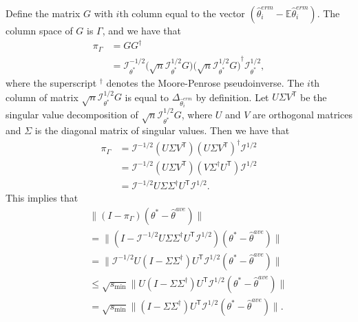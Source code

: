 \documentclass[twoside]{article}
\newcommand{\smin}{s_\text{min}}
\newcommand{\matW}{\hat W}
\newcommand{\matV}{\hat V}
\newcommand{\W}{{\hat \Theta^{\textit{owa}}}}
\newcommand{\E}{\mathbb{E}}
\newcommand{\w}{\theta}
\newcommand{\wave}{\hat\w^{ave}}
\newcommand{\wmle}{\hat\w^{erm}}
\newcommand{\wstar}{{\w^{*}}}
\newcommand{\I}{\mathcal I}
\newcommand{\trans}[1]{\ensuremath{{#1}^{\mathsf{T}}}}
\newcommand{\pinv}[1]{\ensuremath{{#1}^{\mathsf{\dagger}}}}
\newcommand{\ltwo}[1]{{\lVert {#1} \rVert}}
\newcommand{\proj}[1]{\pi_{{#1}}}
\begin{document}
Define the matrix $G$ with $i$th column equal to the vector $(\wmle_i-\E\wmle_i)$.
The column space of $G$ is $\Gamma$,
and we have that
\begin{align}
\proj\Gamma
&=
G\pinv G
\\
&= \I_\wstar^{-1/2}\bigg(\sqrt{n}\I_\wstar^{1/2}G\bigg)
             \pinv{\bigg(\sqrt{n}\I_\wstar^{1/2}G\bigg)}
   \I_\wstar^{1/2}
,
\label{eq:ggpinv}
\end{align}
where the superscript $\pinv{}$ denotes the Moore-Penrose pseudoinverse.
The $i$th column of matrix $\sqrt{n}\I^{1/2}_{\wstar}G$ is equal to $\Delta_{\wmle_i}$ by definition.
%
Let $U\Sigma \trans V$ be the singular value decomposition of $\sqrt{n}\I^{1/2}_{\wstar}G$,
where $U$ and $V$ are orthogonal matrices and $\Sigma$ is the diagonal matrix of singular values.
Then we have that
\begin{align}
\proj\Gamma
&= \I^{-1/2} (U\Sigma \trans V)\pinv{(U \Sigma \trans V)} \I^{1/2}
\\
&= \I^{-1/2} (U\Sigma \trans V)(V \pinv\Sigma \trans U) \I^{1/2}
\\
&= \I^{-1/2} U\Sigma \pinv\Sigma \trans U \I^{1/2}
.
\label{eq:vvp2}
\end{align}
This implies that
\begin{align}
~~~~~&\!\!\!\!\!\!\!\!\!\!\!\ltwo{(I-\proj\Gamma)(\wstar-\wave)}
\nonumber
\\
&=
\ltwo{(I-\I^{-1/2} U\Sigma \pinv\Sigma \trans U \I^{1/2})(\wstar - \wave)}
\\
&=
\ltwo{\I^{-1/2} U(I-\Sigma \pinv\Sigma )\trans U \I^{1/2}(\wstar - \wave)}
\\
&\le
\sqrt{\smin}\ltwo{U(I-\Sigma \pinv\Sigma )\trans U \I^{1/2}(\wstar - \wave)}
\label{eq:fromdefsmin}
\\
&=
\sqrt{\smin}\ltwo{(I-\Sigma \pinv\Sigma )\trans U \I^{1/2}(\wstar - \wave)}
\label{eq:fromrotinvl2}
.
\end{align}
\end{document}
